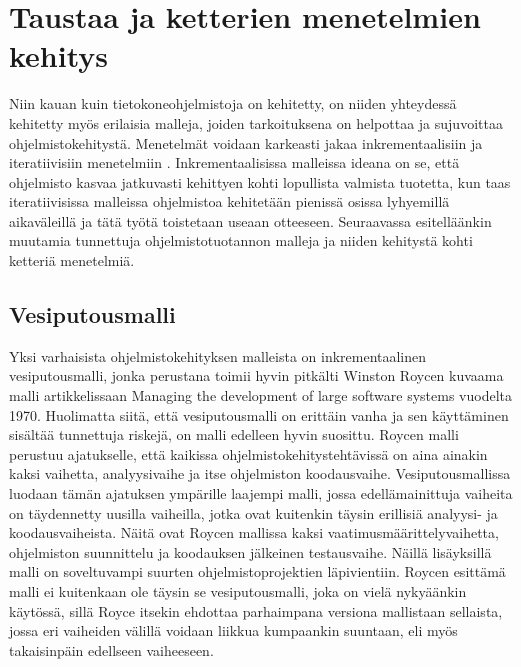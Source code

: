 \documentclass[finnish,nonumbib,nocopyright]{gradu2}
\begin{document}
\section{Taustaa ja ketterien menetelmien kehitys}

Niin kauan kuin tietokoneohjelmistoja on kehitetty, on niiden yhteydessä kehitetty myös erilaisia malleja, joiden tarkoituksena on helpottaa ja sujuvoittaa ohjelmistokehitystä. Menetelmät voidaan karkeasti jakaa inkrementaalisiin ja iteratiivisiin menetelmiin \cite{iterative}. Inkrementaalisissa malleissa ideana on se, että ohjelmisto kasvaa jatkuvasti kehittyen kohti lopullista valmista tuotetta, kun taas iteratiivisissa malleissa ohjelmistoa kehitetään pienissä osissa lyhyemillä aikaväleillä ja tätä työtä toistetaan useaan otteeseen. Seuraavassa esitelläänkin muutamia tunnettuja ohjelmistotuotannon malleja ja niiden kehitystä kohti ketteriä menetelmiä.

\subsection{Vesiputousmalli}

Yksi varhaisista ohjelmistokehityksen malleista on inkrementaalinen vesiputousmalli, jonka perustana toimii hyvin pitkälti Winston Roycen kuvaama malli artikkelissaan Managing the development of large software systems \cite{managing} vuodelta 1970. Huolimatta siitä, että vesiputousmalli on erittäin vanha ja sen käyttäminen sisältää tunnettuja riskejä, on malli edelleen hyvin suosittu. Roycen malli perustuu ajatukselle, että kaikissa ohjelmistokehitystehtävissä on aina ainakin kaksi vaihetta, analyysivaihe ja itse ohjelmiston koodausvaihe. Vesiputousmallissa luodaan tämän ajatuksen ympärille laajempi malli, jossa edellämainittuja vaiheita on täydennetty uusilla vaiheilla, jotka ovat kuitenkin täysin erillisiä analyysi- ja koodausvaiheista. Näitä ovat Roycen mallissa \cite{managing} kaksi vaatimusmäärittelyvaihetta, ohjelmiston suunnittelu ja koodauksen jälkeinen testausvaihe. Näillä lisäyksillä malli on soveltuvampi suurten ohjelmistoprojektien läpivientiin. Roycen esittämä malli ei kuitenkaan ole täysin se vesiputousmalli, joka on vielä nykyäänkin käytössä, sillä Royce itsekin ehdottaa parhaimpana versiona mallistaan sellaista, jossa eri vaiheiden välillä voidaan liikkua kumpaankin suuntaan, eli myös takaisinpäin edellseen vaiheeseen.
\end{document}
